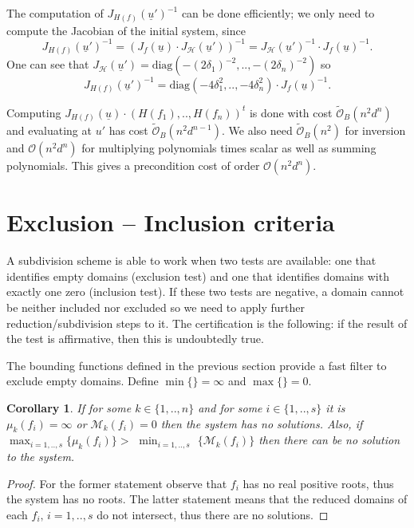 \documentclass{sig-alternate}
\newtheorem{corollary}[theorem]{Corollary}
\newcommand{\dott}{{..}}
\newcommand{\OO}{\ensuremath{\mathcal{O}}\xspace}
\newcommand{\sOB}{\ensuremath{\widetilde{\mathcal{O}}_B}\xspace}
\newcommand{\uvec}[1]{\underline{#1}}
\begin{document}
The computation of $J_{H(f)} ( \uvec u' )^{-1} $ can be done
efficiently; we only need to compute the Jacobian of the initial
system, since
$$
J_{H(f)}(\uvec u')^{-1} = ( J_f(\uvec u) \cdot J_\mathcal H(\uvec u' ))^{-1} = J_\mathcal H(\uvec u')^{-1} \cdot J_f(\uvec u)^{-1}  .
$$
One can see that $ J_\mathcal H(\uvec u')= \text{diag}( -(2\delta_1)^{-2},\dott,-(2\delta_n)^{-2} ) $ so
$$
J_{H(f)}(\uvec u')^{-1}= \text{diag}( -4\delta_1^2,\dott,-4\delta_n^2 ) \cdot J_f(\uvec u)^{-1} .
$$
\fi

 Computing $J_{H(f)}(\uvec
u)\cdot (H(f_1),\dott,H(f_n))^t$ is done with cost $\sOB(n^2d^{n})$
and evaluating at $u'$ has cost $\sOB(n^2d^{n-1})$. We also need
$\sOB(n^2)$ for inversion and $\OO(n^2d^n)$ for multiplying
polynomials times scalar as well as summing polynomials. This
gives a precondition cost of order $\OO(n^2d^n)$.


\section{Exclusion -- Inclusion criteria} \label{criteria}

A subdivision scheme is able to work when two tests are
available: one that identifies empty domains (exclusion test) and one
that identifies domains with exactly one zero (inclusion test). If
these two tests are negative, a domain cannot be neither included nor
excluded so we need to apply further reduction/subdivision steps to it.
The certification is the following: if the result of the test is affirmative,
then this is undoubtedly true.

The bounding functions defined in the previous section provide a fast
filter to exclude empty domains. 
Define $\min\{\}=\infty$ and $\max\{\}=0$.

\begin{corollary}
If for some $k\in\{1,\dott,n\}$ and for some $i\in\{1,\dott,s\}$ it is
$\mu_k(f_i)=\infty$ or $\mathcal M_k(f_i)=0$ then the system has no
solutions.  Also, if $\max_{i=1,\dott,s}\{\mu_k(f_i) \} >$ 
$\min_{i=1,\dott,s}$ $\{\mathcal M_k(f_i) \}$ then there can be no
solution to the system.
\end{corollary}
\begin{proof}
  For the former statement observe that $f_i$ has no real positive
  roots, thus the system has no roots. The latter statement means that
  the reduced domains of each $f_i,\, i=1,\dott,s$ do not intersect, thus
  there are no solutions.
\end{proof}
\end{document}
